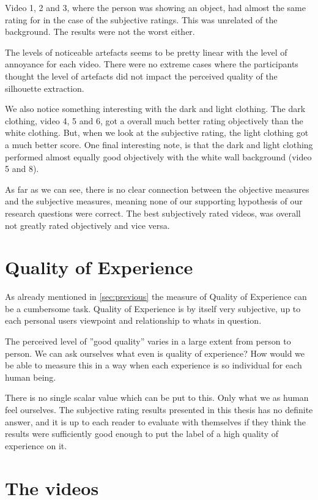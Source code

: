 Video 1, 2 and 3, where the person was showing an object, had almost the same rating for in the case of the subjective ratings. This was unrelated of the background. The results were not the worst either.

The levels of noticeable artefacts seems to be pretty linear with the level of annoyance for each video. There were no extreme cases where the participants thought the level of artefacts did not impact the perceived quality of the silhouette extraction.

We also notice something interesting with the dark and light clothing. The dark clothing, video 4, 5 and 6, got a overall much better rating objectively than the white clothing. But, when we look at the subjective rating, the light clothing got a much better score. One final interesting note, is that the dark and light clothing performed almost equally good objectively with the white wall background (video 5 and 8).

As far as we can see, there is no clear connection between the objective measures and the subjective measures, meaning none of our supporting hypothesis of our research questions were correct. The best subjectively rated videos, was overall not greatly rated objectively and vice versa.


\section{Quality of Experience}\label{sec:disc_qoe}

As already mentioned in \autoref{sec:previous} the measure of Quality of Experience can be a cumbersome task. Quality of Experience is by itself very subjective, up to each personal users viewpoint and relationship to whats in question. 

The perceived level of ''good quality'' varies in a large extent from person to person. We can ask ourselves what even is quality of experience? How would we be able to measure this in a way when each experience is so individual for each human being. 

There is no single scalar value which can be put to this. Only what we as human feel ourselves. The subjective rating results presented in this thesis has no definite answer, and it is up to each reader to evaluate with themselves if they think the results were sufficiently good enough to put the label of a high quality of experience on it. 


\section{The videos}\label{sec:disc_videos}

